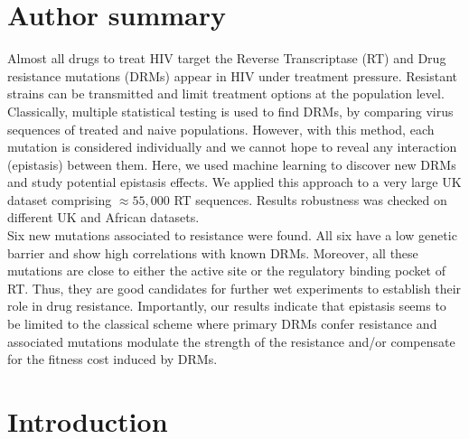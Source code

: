 \documentclass[
  11,
]{scrbook}
\begin{document}
\hypertarget{author-summary}{%
\section*{Author summary}\label{author-summary}}

Almost all drugs to treat HIV target the Reverse Transcriptase (RT) and
Drug resistance mutations (DRMs) appear in HIV under treatment pressure.
Resistant strains can be transmitted and limit treatment options at the
population level. Classically, multiple statistical testing is used to
find DRMs, by comparing virus sequences of treated and naive
populations. However, with this method, each mutation is considered
individually and we cannot hope to reveal any interaction (epistasis)
between them. Here, we used machine learning to discover new DRMs and
study potential epistasis effects. We applied this approach to a very
large UK dataset comprising \(\approx 55,000\) RT sequences. Results
robustness was checked on different UK and African datasets.\\
Six new mutations associated to resistance were found. All six have a
low genetic barrier and show high correlations with known DRMs.
Moreover, all these mutations are close to either the active site or the
regulatory binding pocket of RT. Thus, they are good candidates for
further wet experiments to establish their role in drug resistance.
Importantly, our results indicate that epistasis seems to be limited to
the classical scheme where primary DRMs confer resistance and associated
mutations modulate the strength of the resistance and/or compensate for
the fitness cost induced by DRMs.

\hypertarget{introduction}{%
\section{Introduction}\label{introduction}}
\end{document}
